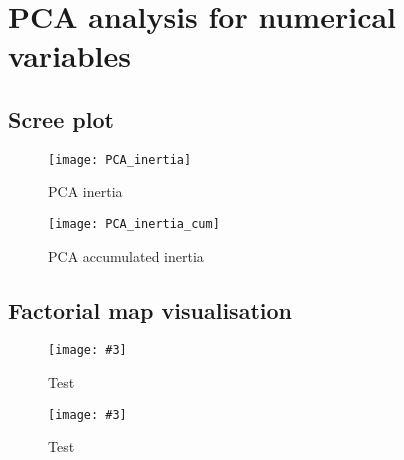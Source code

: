 

\section{PCA analysis for numerical variables}%
\label{sec:pca_analysis_for_numerical_variables}

\subsection{Scree plot}%
\label{sub:scree_plot}


\begin{figure}[H]
    \centering
    \texttt{[image: PCA\_inertia]}
    \caption{PCA inertia}%
    \label{fig:pca_inertia}
\end{figure}

\begin{figure}[H]
    \centering
    \texttt{[image: PCA\_inertia\_cum]}
    \caption{PCA accumulated inertia}%
    \label{fig:pca_inertia_cum}
\end{figure}

\subsection{Factorial map visualisation}%
\label{sub:factorial_map_visualisation}

\newcommand{\factorialmap}[3][1]{
    \begin{figure}[H]
        \centering
        \texttt{[image: \#3]}
        \caption{#2}%
        \label{fig:#3-#1}
    \end{figure}
}

\begin{landscape}

\factorialmap[3]{Test}{PCA_planes_sep}
\factorialmap[4]{Test}{PCA_planes_sep}

\end{landscape}







